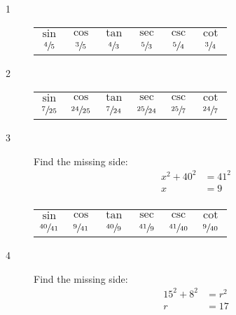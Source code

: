 \documentclass{exam}
\begin{document}
    \begin{description}

      \item[1] 
        \begin{tabular}[H]{cccccc}
          \toprule
          $\sin$         & $\cos$         & $\tan$         & $\sec$         & $\csc$         & $\cot$ \\
          $\sfrac{4}{5}$ & $\sfrac{3}{5}$ & $\sfrac{4}{3}$ & $\sfrac{5}{3}$ & $\sfrac{5}{4}$ & $\sfrac{3}{4}$ \\
          \bottomrule
        \end{tabular}

      \item[2] 
        \begin{tabular}[H]{cccccc}
          \toprule
          $\sin$          & $\cos$           & $\tan$          & $\sec$           & $\csc$          & $\cot$ \\
          $\sfrac{7}{25}$ & $\sfrac{24}{25}$ & $\sfrac{7}{24}$ & $\sfrac{25}{24}$ & $\sfrac{25}{7}$ & $\sfrac{24}{7}$ \\
          \bottomrule
        \end{tabular}

      \item[3] 
        Find the missing side:
        \begin{align*}
          x^2 + 40^2 & = 41^2 \\
          x          & = 9 \\
        \end{align*}

        \begin{tabular}[H]{cccccc}
          \toprule
          $\sin$          & $\cos$           & $\tan$          & $\sec$           & $\csc$          & $\cot$ \\
          $\sfrac{40}{41}$ & $\sfrac{9}{41}$ & $\sfrac{40}{9}$ & $\sfrac{41}{9}$ & $\sfrac{41}{40}$ & $\sfrac{9}{40}$ \\
          \bottomrule
        \end{tabular}

      \item[4] 
        Find the missing side:
        \begin{align*}
          15^2 + 8^2 & = r^2 \\
          r          & = 17 \\
        \end{align*}


\end{description}
\end{document}
